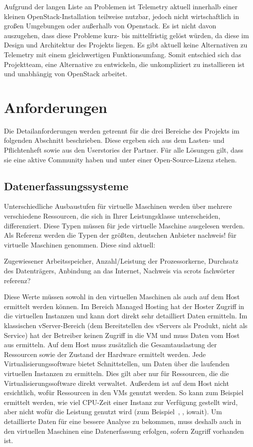 Aufgrund der langen Liste an Problemen ist Telemetry aktuell innerhalb einer
kleinen OpenStack-Installation teilweise nutzbar, jedoch nicht wirtschaftlich
in großen Umgebungen oder außerhalb von Openstack. Es ist nicht davon
auszugehen, dass diese Probleme kurz- bis mittelfristig gelöst würden, da diese
im Design und Architektur des Projekts liegen. Es gibt aktuell keine
Alternativen zu Telemetry mit einem gleichwertigen Funktionsumfang. Somit
entschied sich das Projektteam, eine Alternative zu entwickeln, die
unkompliziert zu installieren ist und unabhängig von OpenStack arbeitet.
\tm%

\section{Anforderungen}
Die Detailanforderungen werden getrennt für die drei Bereiche des Projekts im
folgenden Abschnitt beschrieben. Diese ergeben sich aus dem Lasten- und
Pflichtenheft sowie aus den Userstories der Partner. Für alle Lösungen gilt,
dass sie eine aktive Community haben und unter einer Open-Source-Lizenz stehen.
\tm%

\subsection{Datenerfassungssysteme}
\label{section:datenerfassungssysteme}
Unterschiedliche Ausbaustufen für virtuelle Maschinen werden über mehrere
verschiedene Ressourcen, die sich in Ihrer Leistungsklasse unterscheiden,
differenziert. Diese Typen müssen für jede virtuelle Maschine ausgelesen werden.
Als Referenz werden die Typen der größten, deutschen Anbieter nachweis! für
virtuelle Maschinen genommen. Diese sind aktuell:

Zugewiesener Arbeitsspeicher, Anzahl/Leistung der Prozessorkerne, Durchsatz des
Datenträgers, Anbindung an das Internet, Nachweis via scrots fachwörter
referenz?

Diese Werte müssen sowohl in den virtuellen Maschinen als auch auf dem Host
ermittelt werden können. Im Bereich Managed Hosting hat der Hoster Zugriff in
die virtuellen Instanzen und kann dort direkt sehr detailliert Daten ermitteln.
Im klassischen vServer-Bereich (dem Bereitstellen des vServers als Produkt,
nicht als Service) hat der Betreiber keinen Zugriff in die VM und muss Daten
vom Host aus ermitteln. Auf dem Host muss zusätzlich die Gesamtauslastung der
Ressourcen sowie der Zustand der Hardware ermittelt werden. Jede
Virtualisierungssoftware bietet Schnittstellen, um Daten über die laufenden
virtuellen Instanzen zu ermitteln. Dies gilt aber nur für Ressourcen, die die
Virtualisierungssoftware direkt verwaltet. Außerdem ist auf dem Host nicht
ersichtlich, wofür Ressourcen in den VMs genutzt werden. So kann zum Beispiel
ermittelt werden, wie viel CPU-Zeit einer Instanz zur Verfügung gestellt wird,
aber nicht wofür die Leistung genutzt wird (zum
Beispiel~, ,
\gls{iowait}). Um detaillierte Daten für eine bessere Analyse zu bekommen, muss
deshalb auch in den virtuellen Maschinen eine Datenerfassung erfolgen, sofern
Zugriff vorhanden ist.

